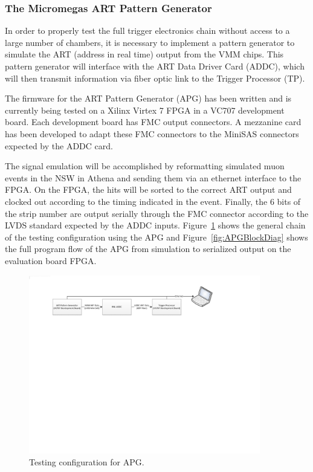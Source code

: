 
\subsubsection{The Micromegas ART Pattern Generator}

In order to properly test the full trigger electronics chain without
access to a large number of chambers, it is necessary to implement a
pattern generator  to simulate the ART (address in real time) output
from the VMM chips. This pattern generator will interface with the
ART Data Driver Card (ADDC), which will then transmit information via
fiber optic link to the Trigger Processor (TP).

The firmware for the ART Pattern Generator (APG) has been written and
is currently being tested on a Xilinx
Virtex 7 FPGA in a VC707 development board. Each development board has
FMC output connectors. A mezzanine
card has been developed to adapt these FMC connectors to the MiniSAS
connectors expected by the ADDC card.

The signal emulation will be accomplished by reformatting simulated
muon events in the NSW in Athena and sending them via an ethernet
interface to the FPGA. On the FPGA, the hits will be sorted to the
correct ART output and clocked out according to the timing indicated
in the event. Finally, the 6 bits of the strip number are output
serially through the FMC connector according to the LVDS standard
expected by the ADDC inputs. Figure~\ref{fig:artDataStimPG} shows the
general chain of the testing configuration using the APG and 
Figure~\ref{fig:APGBlockDiag} shows the full program flow of the APG from simulation to serialized output on the evaluation board FPGA.

\begin{figure}[h]
 \begin{center}
 \includegraphics[width=0.9\textwidth]{figures/testing/artDataStimPG.pdf}
 \caption{Testing configuration for APG.}
 \label{fig:artDataStimPG}
 \end{center}
 \end{figure}

